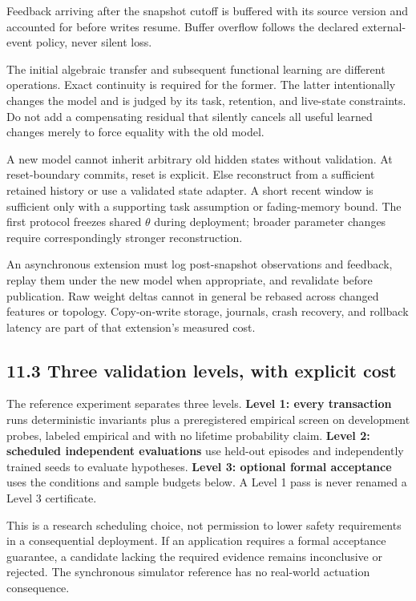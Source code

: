 \documentclass[
  11pt,
  a4paper,
]{article}
\begin{document}
Feedback arriving after the snapshot cutoff is buffered with its source
version and accounted for before writes resume. Buffer overflow follows
the declared external-event policy, never silent loss.

The initial algebraic transfer and subsequent functional learning are
different operations. Exact continuity is required for the former. The
latter intentionally changes the model and is judged by its task,
retention, and live-state constraints. Do not add a compensating
residual that silently cancels all useful learned changes merely to
force equality with the old model.

A new model cannot inherit arbitrary old hidden states without
validation. At reset-boundary commits, reset is explicit. Else
reconstruct from a sufficient retained history or use a validated state
adapter. A short recent window is sufficient only with a supporting task
assumption or fading-memory bound. The first protocol freezes shared
\(\theta\) during deployment; broader parameter changes require
correspondingly stronger reconstruction.

An asynchronous extension must log post-snapshot observations and
feedback, replay them under the new model when appropriate, and
revalidate before publication. Raw weight deltas cannot in general be
rebased across changed features or topology. Copy-on-write storage,
journals, crash recovery, and rollback latency are part of that
extension's measured cost.

\subsection{11.3 Three validation levels, with explicit
cost}\label{three-validation-levels-with-explicit-cost}

The reference experiment separates three levels. \textbf{Level 1: every
transaction} runs deterministic invariants plus a preregistered
empirical screen on development probes, labeled empirical and with no
lifetime probability claim. \textbf{Level 2: scheduled independent
evaluations} use held-out episodes and independently trained seeds to
evaluate hypotheses. \textbf{Level 3: optional formal acceptance} uses
the conditions and sample budgets below. A Level 1 pass is never renamed
a Level 3 certificate.

This is a research scheduling choice, not permission to lower safety
requirements in a consequential deployment. If an application requires a
formal acceptance guarantee, a candidate lacking the required evidence
remains inconclusive or rejected. The synchronous simulator reference
has no real-world actuation consequence.
\end{document}
